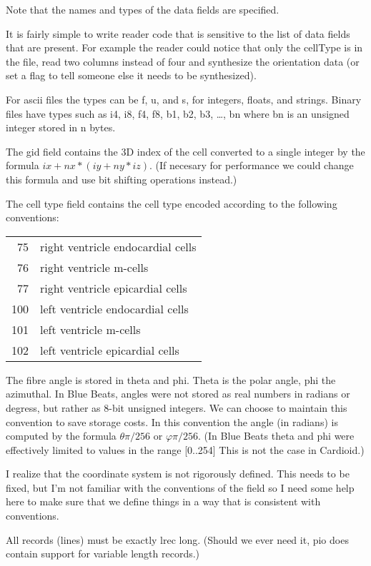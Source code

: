 \documentclass{article}
\begin{document}
Note that the names and types of the data fields are specified.  

It is fairly simple to write reader code that is sensitive to the list
of data fields that are present.  For example the reader could notice
that only the cellType is in the file, read two columns instead of four
and synthesize the orientation data (or set a flag to tell someone else
it needs to be synthesized).

For ascii files the types can be f, u, and s, for integers, floats, and
strings.  Binary files have types such as i4, i8, f4, f8, b1, b2, b3, \ldots,
bn where bn is an unsigned integer stored in n bytes.

The gid field contains the 3D index of the cell converted to a single
integer by the formula $ix + nx*(iy + ny*iz)$.  (If necesary for
performance we could change this formula and use bit shifting operations
instead.)

The cell type field contains the cell type encoded according to the
following conventions:
\begin{center}
  \begin{tabular}{rl}
    75 & right ventricle endocardial cells\\
    76 & right ventricle m-cells\\
    77 & right ventricle epicardial cells\\
    100 & left ventricle endocardial cells\\
    101 & left ventricle m-cells\\
    102 & left ventricle epicardial cells\\
  \end{tabular}
\end{center}

The fibre angle is stored in theta and phi.  Theta is the polar angle,
phi the azimuthal.  In Blue Beats, angles were not stored as real
numbers in radians or degress, but rather as 8-bit unsigned integers.
We can choose to maintain this convention to save storage costs.  In
this convention the angle (in radians) is computed by the formula
$\theta\pi/256$ or $\varphi\pi/256$.  (In Blue Beats theta and phi were
effectively limited to values in the range [0..254]  This is not the
case in Cardioid.)

I realize that the coordinate system is not rigorously defined.  This
needs to be fixed, but I'm not familiar with the conventions of the
field so I need some help here to make sure that we define things in a
way that is consistent with conventions.

All records (lines) must be exactly lrec long.  (Should we ever need it,
pio does contain support for variable length records.)
\end{document}
